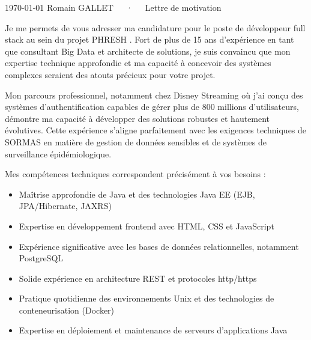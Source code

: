 \documentclass[11pt, a4paper]{awesome-cv}
\begin{document}
\makecvheader[R]

\makecvfooter
  {\today}
  {Romain GALLET~~~·~~~Lettre de motivation}
  {}

\makelettertitle

\begin{cvletter}


Je me permets de vous adresser ma candidature pour le poste de développeur full stack au sein du projet PHRESH . Fort de plus de 15 ans d'expérience en tant que consultant Big Data et architecte de solutions,
je suis convaincu que mon expertise technique approfondie et ma capacité à concevoir des systèmes complexes seraient des atouts précieux pour votre projet.

Mon parcours professionnel, notamment chez Disney Streaming où j'ai conçu des systèmes d'authentification capables de gérer plus de 800 millions d'utilisateurs, démontre ma capacité à développer des solutions
robustes et hautement évolutives. Cette expérience s'aligne parfaitement avec les exigences techniques de SORMAS en matière de gestion de données sensibles et de systèmes de surveillance épidémiologique.

Mes compétences techniques correspondent précisément à vos besoins :

\begin{itemize}
\setlength\itemsep{-0.8em}
\item Maîtrise approfondie de Java et des technologies Java EE (EJB, JPA/Hibernate, JAXRS)
\item Expertise en développement frontend avec HTML, CSS et JavaScript
\item Expérience significative avec les bases de données relationnelles, notamment PostgreSQL
\item Solide expérience en architecture REST et protocoles http/https
\item Pratique quotidienne des environnements Unix et des technologies de conteneurisation (Docker)
\item Expertise en déploiement et maintenance de serveurs d'applications Java
\end{itemize}


\end{cvletter}
\end{document}
